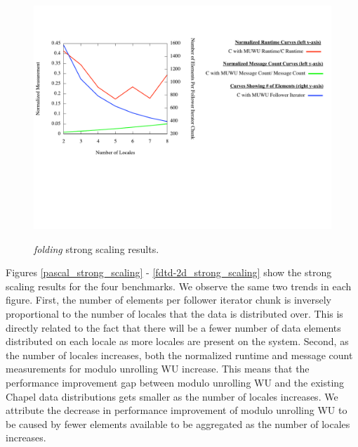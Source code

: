 \begin{figure}
\begin{center}
\includegraphics[width=\linewidth]{./Figures/strong_scaling/folding.pdf}
\renewcommand{\baselinestretch}{1}
\small\normalsize
\begin{quote}
\caption[\textit{folding} strong scaling results]{\textit{folding} strong scaling results.\label{folding_strong_scaling}}
\end{quote}
\end{center}
\end{figure}

Figures \ref{pascal_strong_scaling} - \ref{fdtd-2d_strong_scaling} show the strong scaling results for the four benchmarks. We observe the same two trends in each figure. First, the number of elements per follower iterator chunk is inversely proportional to the number of locales that the data is distributed over. This is directly related to the fact that there will be a fewer number of data elements distributed on each locale as more locales are present on the system. Second, as the number of locales increases, both the normalized runtime and message count measurements for modulo unrolling WU increase. This means that the performance improvement gap between modulo unrolling WU and the existing Chapel data distributions gets smaller as the number of locales increases. We attribute the decrease in performance improvement of modulo unrolling WU to be caused by fewer elements available to be aggregated as the number of locales increases.  

